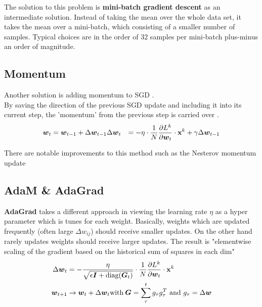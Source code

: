 The solution to this problem is \textbf{mini-batch gradient descent} as an intermediate solution.
Instead of taking the mean over the whole data set, it takes the mean over a mini-batch, which consisting of a smaller number of samples.
Typical choices are in the order of 32 samples per mini-batch plus-minus an order of magnitude.

\subsection{Momentum}
Another solution is adding momentum to SGD \cite{momentum}.\\
By saving the direction of the previous SGD update and including it into its current step, the 'momentum' from the previous step is carried over \cite{ommer}.
\begin{align}
    \boldsymbol{w}_t & = \boldsymbol{w}_{t-1} + \Delta \boldsymbol{w}_{t-1}
    \Delta \boldsymbol{w}_t & = - \eta \cdot \frac{1}{N} \frac{\partial L^k}{\partial \boldsymbol{w}_t} \cdot \mathbf{x}^k + \gamma \Delta \boldsymbol{w}_{t-1}\\
\end{align}

There are notable improvements to this method such as the Nesterov momentum update \cite{ommer}

\subsection{AdaM \& AdaGrad}
\textbf{AdaGrad} takes a different approach in viewing the learning rate $\eta$ as a hyper parameter which is tunes for each weight.
Basically, weights which are updated frequently (often large $\Delta w_{ij}$) should receive smaller updates.
On the other hand rarely updates weights should receive larger updates.
The result is "elementwise scaling of the gradient based on the historical sum of squares in each dim" \cite{ommer}
\begin{align}
    \Delta \boldsymbol{w}_t & = - \frac{\eta}{\sqrt{\epsilon \boldsymbol{I} + \text{diag}(\boldsymbol{G}_t)}} \cdot \frac{1}{N} \frac{\partial L^k}{\partial \boldsymbol{w}_t} \cdot \mathbf{x}^k \\
    \boldsymbol{w}_{t+1} & \rightarrow \boldsymbol{w}_t + \Delta \boldsymbol{w}_t
    \text{with} \: \boldsymbol{G} = \sum_{\tau}^{t} g_\tau g_\tau^T \text{ and } g_\tau = \Delta \boldsymbol{w}
\end{align}

